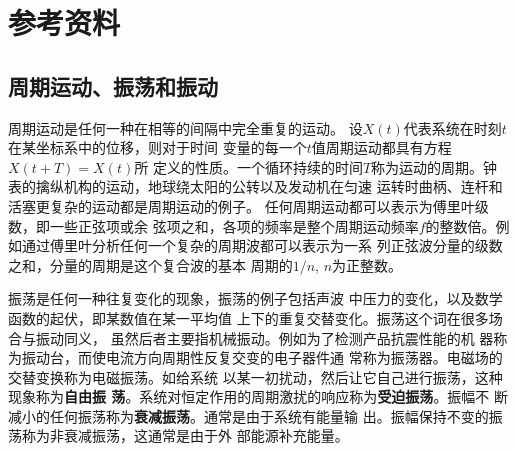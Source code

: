 




























































\section{参考资料}
\subsection{周期运动、振荡和振动}
周期运动是任何一种在相等的间隔中完全重复的运动。
设$X(t)$代表系统在时刻$t$在某坐标系中的位移，则对于时间
变量的每一个$t$值周期运动都具有方程$X(t+T)=X(t)$所
定义的性质。一个循环持续的时间$T$称为运动的周期。钟
表的擒纵机构的运动，地球绕太阳的公转以及发动机在匀速
运转时曲柄、连杆和活塞更复杂的运动都是周期运动的例子。
任何周期运动都可以表示为傅里叶级数，即一些正弦项或余
弦项之和，各项的频率是整个周期运动频率$f$的整数倍。例
如通过傅里叶分析任何一个复杂的周期波都可以表示为一系
列正弦波分量的级数之和，分量的周期是这个复合波的基本
周期的$1/n$, $n$为正整数。

振荡是任何一种往复变化的现象，振荡的例子包括声波
中压力的变化，以及数学函数的起伏，即某数值在某一平均值
上下的重复交替变化。振荡这个词在很多场合与振动同义，
虽然后者主要指机械振动。例如为了检测产品抗震性能的机
器称为振动台，而使电流方向周期性反复交变的电子器件通
常称为振荡器。电磁场的交替变换称为电磁振荡。如给系统
以某一初扰动，然后让它自己进行振荡，这种现象称为\textbf{自由振
荡}。系统对恒定作用的周期激扰的响应称为\textbf{受迫振荡}。振幅不
断减小的任何振荡称为\textbf{衰减振荡}。通常是由于系统有能量输
出。振幅保持不变的振荡称为非衰减振荡，这通常是由于外
部能源补充能量。

